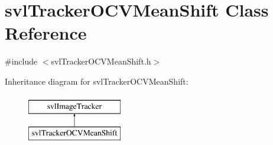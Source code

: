 \hypertarget{classsvl_tracker_o_c_v_mean_shift}{\section{svl\-Tracker\-O\-C\-V\-Mean\-Shift Class Reference}
\label{classsvl_tracker_o_c_v_mean_shift}
}


{\ttfamily \#include $<$svl\-Tracker\-O\-C\-V\-Mean\-Shift.\-h$>$}

Inheritance diagram for svl\-Tracker\-O\-C\-V\-Mean\-Shift\-:\begin{figure}[H]
\begin{center}
\leavevmode
\includegraphics[height=2.000000cm]{d2/d5b/classsvl_tracker_o_c_v_mean_shift}
\end{center}
\end{figure}
